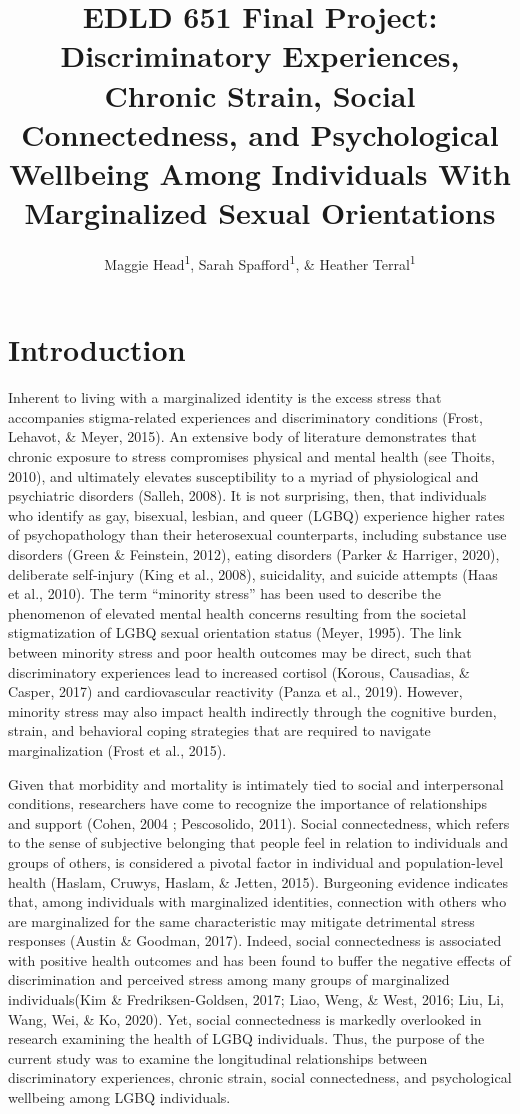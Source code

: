 \documentclass[
  english,
  man,floatsintext]{apa6}
\title{EDLD 651 Final Project: Discriminatory Experiences, Chronic Strain, Social Connectedness, and Psychological Wellbeing Among Individuals With Marginalized Sexual Orientations}
\author{Maggie Head\textsuperscript{1}, Sarah Spafford\textsuperscript{1}, \& Heather Terral\textsuperscript{1}}
\date{}
\affiliation{\vspace{0.5cm}\textsuperscript{1} University of Oregon}
\begin{document}
\maketitle

\hypertarget{introduction}{%
\section{Introduction}\label{introduction}}

Inherent to living with a marginalized identity is the excess stress that accompanies stigma-related experiences and discriminatory conditions (Frost, Lehavot, \& Meyer, 2015). An extensive body of literature demonstrates that chronic exposure to stress compromises physical and mental health (see Thoits, 2010), and ultimately elevates susceptibility to a myriad of physiological and psychiatric disorders (Salleh, 2008). It is not surprising, then, that individuals who identify as gay, bisexual, lesbian, and queer (LGBQ) experience higher rates of psychopathology than their heterosexual counterparts, including substance use disorders (Green \& Feinstein, 2012), eating disorders (Parker \& Harriger, 2020), deliberate self-injury (King et al., 2008), suicidality, and suicide attempts (Haas et al., 2010). The term \enquote{minority stress} has been used to describe the phenomenon of elevated mental health concerns resulting from the societal stigmatization of LGBQ sexual orientation status (Meyer, 1995). The link between minority stress and poor health outcomes may be direct, such that discriminatory experiences lead to increased cortisol (Korous, Causadias, \& Casper, 2017) and cardiovascular reactivity (Panza et al., 2019). However, minority stress may also impact health indirectly through the cognitive burden, strain, and behavioral coping strategies that are required to navigate marginalization (Frost et al., 2015).

Given that morbidity and mortality is intimately tied to social and interpersonal conditions, researchers have come to recognize the importance of relationships and support (Cohen, 2004 ; Pescosolido, 2011). Social connectedness, which refers to the sense of subjective belonging that people feel in relation to individuals and groups of others, is considered a pivotal factor in individual and population-level health (Haslam, Cruwys, Haslam, \& Jetten, 2015). Burgeoning evidence indicates that, among individuals with marginalized identities, connection with others who are marginalized for the same characteristic may mitigate detrimental stress responses (Austin \& Goodman, 2017). Indeed, social connectedness is associated with positive health outcomes and has been found to buffer the negative effects of discrimination and perceived stress among many groups of marginalized individuals(Kim \& Fredriksen-Goldsen, 2017; Liao, Weng, \& West, 2016; Liu, Li, Wang, Wei, \& Ko, 2020). Yet, social connectedness is markedly overlooked in research examining the health of LGBQ individuals. Thus, the purpose of the current study was to examine the longitudinal relationships between discriminatory experiences, chronic strain, social connectedness, and psychological wellbeing among LGBQ individuals.
\end{document}
